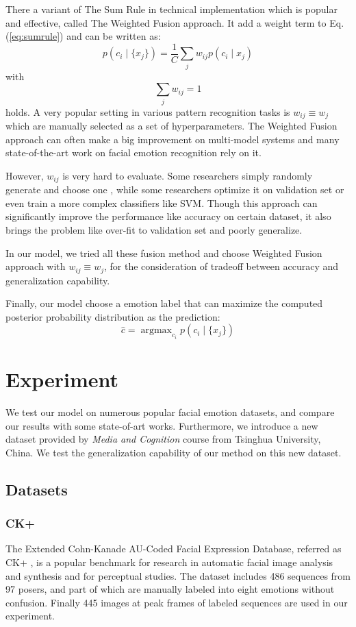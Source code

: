 \documentclass[conference]{IEEEtran}
\newcommand{\eqref}[1]{Eq.(\ref{#1})}
\begin{document}
There a variant of The Sum Rule in technical implementation which is popular and effective, called The Weighted Fusion approach. It add a weight term to \eqref{eq:sumrule} and can be written as:
\begin{equation}
\label{eq:wf}
p(c_i\mid \{x_j\})=\frac{1}{C}\sum_j w_{ij}p(c_i\mid x_j)
\end{equation}
with
\[ \sum_j w_{ij}=1 \]
holds. A very popular setting in various pattern recognition tasks is $w_{ij}\equiv w_j$ which are manually selected as a set of hyperparameters. The Weighted Fusion approach can often make a big improvement on multi-model systems and many state-of-the-art work on facial emotion recognition rely on it.

However, $w_{ij}$ is very hard to evaluate. Some researchers simply randomly generate and choose one \cite{Kaya2017Video}, while some researchers optimize it on validation set or even train a more complex classifiers like SVM. Though this approach can significantly improve the performance like accuracy on certain dataset, it also brings the problem like over-fit to validation set and poorly generalize.

In our model, we tried all these fusion method and choose Weighted Fusion approach with $w_{ij}\equiv w_j$, for the consideration of tradeoff between accuracy and generalization capability.

Finally, our model choose a emotion label that can maximize the computed posterior probability distribution as the prediction:
\begin{equation}
\label{eq:pred}
\hat{c}=\mathop{\arg\max}_{c_i} p(c_i\mid \{x_j\})
\end{equation}

\section{Experiment}
\label{sec:exp}
We test our model on numerous popular facial emotion datasets, and compare our results with some state-of-art works. Furthermore, we introduce a new dataset provided by \emph{Media and Cognition} course from Tsinghua University, China. We test the generalization capability of our method on this new dataset.

\subsection{Datasets}

\subsubsection{CK+}
The Extended Cohn-Kanade AU-Coded Facial Expression Database, referred as CK+ \cite{Lucey2010The}, is a popular benchmark for research in automatic facial image analysis and synthesis and for perceptual studies. The dataset includes 486 sequences from 97 posers, and part of which are manually labeled into eight emotions without confusion. Finally 445 images at peak frames of labeled sequences are used in our experiment.
\end{document}
